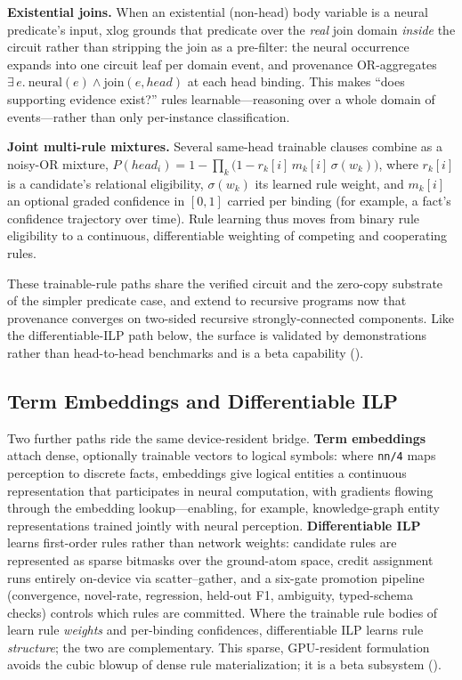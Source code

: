 \textbf{Existential joins.} When an existential (non-head) body variable is a neural predicate's input, xlog grounds that predicate over the \emph{real} join domain \emph{inside} the circuit rather than stripping the join as a pre-filter: the neural occurrence expands into one circuit leaf per domain event, and provenance OR-aggregates $\exists\,e.\ \mathrm{neural}(e)\wedge\mathrm{join}(e,\mathit{head})$ at each head binding. This makes ``does supporting evidence exist?'' rules learnable---reasoning over a whole domain of events---rather than only per-instance classification.

\textbf{Joint multi-rule mixtures.} Several same-head trainable clauses combine as a noisy-OR mixture, $P(\mathit{head}_i)=1-\prod_k\bigl(1-r_k[i]\,m_k[i]\,\sigma(w_k)\bigr)$, where $r_k[i]$ is a candidate's relational eligibility, $\sigma(w_k)$ its learned rule weight, and $m_k[i]$ an optional graded confidence in $[0,1]$ carried per binding (for example, a fact's confidence trajectory over time). Rule learning thus moves from binary rule eligibility to a continuous, differentiable weighting of competing and cooperating rules.

These trainable-rule paths share the verified circuit and the zero-copy substrate of the simpler predicate case, and extend to recursive programs now that provenance converges on two-sided recursive strongly-connected components. Like the differentiable-ILP path below, the surface is validated by demonstrations rather than head-to-head benchmarks and is a beta capability ().

\subsection{Term Embeddings and Differentiable ILP}

Two further paths ride the same device-resident bridge. \textbf{Term embeddings} attach dense, optionally trainable vectors to logical symbols: where \texttt{nn/4} maps perception to discrete facts, embeddings give logical entities a continuous representation that participates in neural computation, with gradients flowing through the embedding lookup---enabling, for example, knowledge-graph entity representations trained jointly with neural perception. \textbf{Differentiable ILP} learns first-order rules rather than network weights: candidate rules are represented as sparse bitmasks over the ground-atom space, credit assignment runs entirely on-device via scatter--gather, and a six-gate promotion pipeline (convergence, novel-rate, regression, held-out F1, ambiguity, typed-schema checks) controls which rules are committed. Where the trainable rule bodies of  learn rule \emph{weights} and per-binding confidences, differentiable ILP learns rule \emph{structure}; the two are complementary. This sparse, GPU-resident formulation avoids the cubic blowup of dense rule materialization; it is a beta subsystem ().
